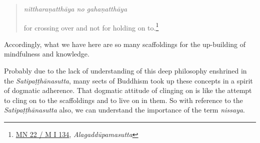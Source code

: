\begin{quote}
\emph{nittharaṇatthāya no gahaṇatthāya}

for crossing over and not for holding on to.\footnote{\href{https://suttacentral.net/mn22/pli/ms}{MN 22 / M I 134}, \emph{Alagaddūpamasutta}}
\end{quote}

Accordingly, what we have here are so many scaffoldings for the up-building of mindfulness and knowledge.

Probably due to the lack of understanding of this deep philosophy enshrined in the \emph{Satipaṭṭhānasutta}, many sects of Buddhism took up these concepts in a spirit of dogmatic adherence. That dogmatic attitude of clinging on is like the attempt to cling on to the scaffoldings and to live on in them. So with reference to the \emph{Satipaṭṭhānasutta} also, we can understand the importance of the term \emph{nissaya}.
